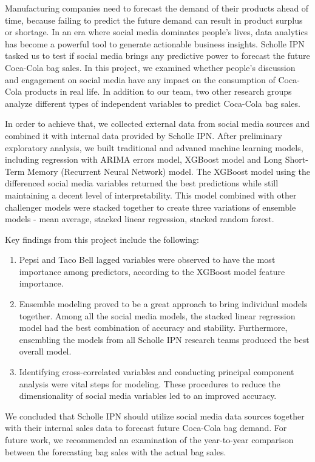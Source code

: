 \documentclass[12pt,oneside]{chicagocapstone}
\providecommand{\tightlist}{%
  \setlength{\itemsep}{0pt}\setlength{\parskip}{0pt}}
\def\labelenumi{\arabic{enumi}.}
\begin{document}
  \begin{executive}
    Manufacturing companies need to forecast the demand of their products ahead of time, because failing to predict the future demand can result in product surplus or shortage. In an era where social media dominates people's lives, data analytics has become a powerful tool to generate actionable business insights. Scholle IPN tasked us to test if social media brings any predictive power to forecast the future Coca-Cola bag sales. In this project, we examined whether people's discussion and engagement on social media have any impact on the consumption of Coca-Cola products in real life. In addition to our team, two other research groups analyze different types of independent variables to predict Coca-Cola bag sales.
    
    In order to achieve that, we collected external data from social media sources and combined it with internal data provided by Scholle IPN. After preliminary exploratory analysis, we built traditional and advaned machine learning models, including regression with ARIMA errors model, XGBoost model and Long Short-Term Memory (Recurrent Neural Network) model. The XGBoost model using the differenced social media variables returned the best predictions while still maintaining a decent level of interpretability. This model combined with other challenger models were stacked together to create three variations of ensemble models - mean average, stacked linear regression, stacked random forest.
    
    Key findings from this project include the following:
    \begin{enumerate}
    \def\labelenumi{\arabic{enumi}.}
    \tightlist
    \item
      Pepsi and Taco Bell lagged variables were observed to have the most importance among predictors, according to the XGBoost model feature importance.
    \item
      Ensemble modeling proved to be a great approach to bring individual models together. Among all the social media models, the stacked linear regression model had the best combination of accuracy and stability. Furthermore, ensembling the models from all Scholle IPN research teams produced the best overall model.
    \item
      Identifying cross-correlated variables and conducting principal component analysis were vital steps for modeling. These procedures to reduce the dimensionality of social media variables led to an improved accuracy.
    \end{enumerate}
    We concluded that Scholle IPN should utilize social media data sources together with their internal sales data to forecast future Coca-Cola bag demand. For future work, we recommended an examination of the year-to-year comparison between the forecasting bag sales with the actual bag sales.\\
  \end{executive}
\end{document}
